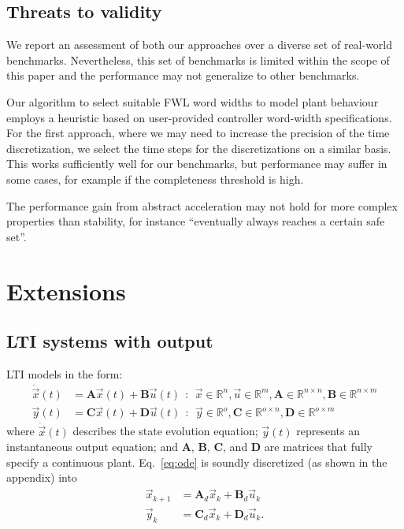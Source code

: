 \documentclass[runningheads,a4paper]{llncs}
\newcommand{\mat}[1]{\boldsymbol{#1}}
\begin{document}
\subsection{Threats to validity}
We report an assessment of both our approaches over a diverse set of real-world benchmarks. Nevertheless, this set of benchmarks is limited within the scope of this paper and the performance may not generalize to other benchmarks. 

Our algorithm to select suitable FWL word widths to model plant behaviour employs a heuristic based on user-provided controller word-width specifications. For the first approach, where we may need to increase the precision of the time discretization, we select the time steps for the discretizations on a similar basis. This works sufficiently well for our benchmarks, but performance may suffer in some cases, for example if the completeness threshold is high. 

The performance gain from abstract acceleration may not hold for more complex properties than stability, for instance ``eventually always reaches a certain safe set''. 




\section{Extensions}
\label{sec:extensions}

\subsection{LTI systems with output} 
\label{ssec:LTI}

LTI models in the form: 
%
\begin{align}
\dot{\vec{x}}(t)&=\mat{A}\vec{x}(t)+\mat{B}\vec{u}(t)\ \ :\ \ \vec{x} \in \mathbb{R}^{n}, \vec{u} \in \mathbb{R}^m, \mat{A} \in \mathbb{R}^{n \times n},\mat{B} \in \mathbb{R}^{n \times m}\\
\vec{y}(t)&=\mat{C}\vec{x}(t)+\mat{D}\vec{u}(t)\ \ :\ \ \vec{y} \in \mathbb{R}^{o}, \mat{C} \in \mathbb{R}^{o \times n}, \mat{D}  \in \mathbb{R}^{o \times m}\nonumber
\end{align}
\noindent where $\dot{\vec{x}}(t)$ describes the state evolution equation; 
$\vec{y}(t)$ represents an instantaneous output equation; and $\mat{A}$, $\mat{B}$, $\mat{C}$, and $\mat{D}$ are matrices that fully specify 
a continuous plant. Eq.~\eqref{eq:ode} is soundly discretized 
(as shown in the appendix) into
%
\begin{align}
\vec{x}_{k+1}&=\mat{A}_d\vec{x}_k+\mat{B}_d\vec{u}_k\\
\vec{y}_k&=\mat{C}_d\vec{x}_k+\mat{D}_d\vec{u}_k .\nonumber
\end{align}
%
\end{document}
